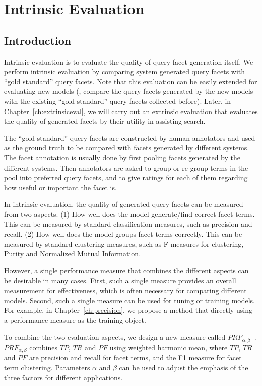 \chapter{Intrinsic Evaluation} 
\label{ch:intrinsiceval}
\section{Introduction}
Intrinsic evaluation is to evaluate the quality of query facet generation itself. We perform intrinsic evaluation by comparing system generated query facets with ``gold standard'' query facets. Note that this evaluation can be easily extended for evaluating new models (\ie, compare the query facets generated by the new models with the existing ``gold standard'' query facets  collected before). Later, in Chapter~\ref{ch:extrinsiceval}, we will carry out an extrinsic evaluation that evaluates the quality of generated facets by their utility in assisting search.

The ``gold standard'' query facets are constructed by human annotators and used as the ground truth to be compared with facets generated by different systems. The facet annotation is usually done by first pooling facets generated by the different systems. Then annotators are asked to group or re-group terms in the pool into preferred query facets, and to give ratings for each of them regarding how useful or important the facet is.


In intrinsic evaluation, the quality of generated query facets can be measured from two aspects. (1) How well does the model generate/find correct facet terms. This can be measured by standard classification measures, such as precision and recall. (2) How well does the model groups facet terms correctly. This can be measured by standard clustering measures, such as F-measures for clustering, Purity and Normalized Mutual Information.

However, a single performance measure that combines the different aspects can be desirable in many cases. First, such a single measure provides an overall measurement for effectiveness, which is often necessary for comparing different models. Second, such a single measure can be used for tuning or training models. For example, in Chapter~\ref{ch:precision}, we propose a method that directly using a performance measure as the training object. 

To combine the two evaluation aspects, we design a new measure called $PRF_{\alpha,\beta}$~\cite{kong2013extracting}. $PRF_{\alpha,\beta}$ combines $TP$, $TR$ and $PF$ using weighted harmonic mean, where $TP$, $TR$ and $PF$ are precision and recall for facet terms, and the F1 measure for facet term clustering. Parameters $\alpha$ and $\beta$ can be used to adjust the emphasis of the three factors for different applications.


